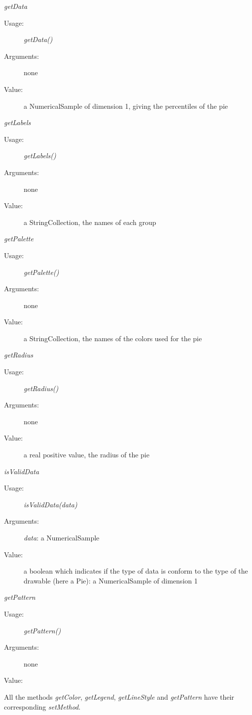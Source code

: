 \begin{description}
\begin{description}
  \item \textit{getData}
    \begin{description}
    \item[Usage:] \textit{getData()}
    \item[Arguments:] none
    \item[Value:] a NumericalSample of dimension 1, giving the percentiles of the pie
    \end{description}
    \bigskip
  \item \textit{getLabels}
    \begin{description}
    \item[Usage:] \textit{getLabels()}
    \item[Arguments:] none
    \item[Value:] a StringCollection, the names of each group
    \end{description}
    \bigskip
  \item \textit{getPalette}
    \begin{description}
    \item[Usage:] \textit{getPalette()}
    \item[Arguments:] none
    \item[Value:] a StringCollection, the names of the colors used for the pie
    \end{description}
    \bigskip
  \item \textit{getRadius}
    \begin{description}
    \item[Usage:] \textit{getRadius()}
    \item[Arguments:] none
    \item[Value:] a real positive value, the radius of the pie
    \end{description}
    \bigskip
  \item \textit{isValidData}
    \begin{description}
    \item[Usage:] \textit{isValidData(data)}
    \item[Arguments:] \textit{data}: a NumericalSample
    \item[Value:] a boolean which indicates if the type of data is conform to the type of the drawable (here a Pie): a NumericalSample of dimension 1
    \end{description}

    \bigskip
  \item \textit{getPattern}
    \begin{description}
    \item[Usage:] \textit{getPattern()}
    \item[Arguments:] none
    \item[Value:]
    \end{description}

  \end{description}

  All the methods \textit{getColor},  \textit{getLegend},  \textit{getLineStyle}  and \textit{getPattern} have their corresponding \textit{setMethod}.

\end{description}


